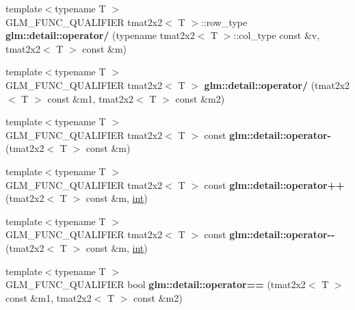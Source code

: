 \begin{DoxyCompactItemize}
\item 
\hypertarget{namespaceglm_1_1detail_af9e81bd9e91febb17004379caf5735a8}{}{\footnotesize template$<$typename T $>$ }\\G\+L\+M\+\_\+\+F\+U\+N\+C\+\_\+\+Q\+U\+A\+L\+I\+F\+I\+E\+R tmat2x2$<$ T $>$\+::row\+\_\+type {\bfseries glm\+::detail\+::operator/} (typename tmat2x2$<$ T $>$\+::col\+\_\+type const \&v, tmat2x2$<$ T $>$ const \&m)\label{namespaceglm_1_1detail_af9e81bd9e91febb17004379caf5735a8}

\item 
\hypertarget{namespaceglm_1_1detail_ab5912b54dc7146602edd91f006f4462b}{}{\footnotesize template$<$typename T $>$ }\\G\+L\+M\+\_\+\+F\+U\+N\+C\+\_\+\+Q\+U\+A\+L\+I\+F\+I\+E\+R tmat2x2$<$ T $>$ {\bfseries glm\+::detail\+::operator/} (tmat2x2$<$ T $>$ const \&m1, tmat2x2$<$ T $>$ const \&m2)\label{namespaceglm_1_1detail_ab5912b54dc7146602edd91f006f4462b}

\item 
\hypertarget{namespaceglm_1_1detail_a390878b96c35ed9f2001ef52fab96b76}{}{\footnotesize template$<$typename T $>$ }\\G\+L\+M\+\_\+\+F\+U\+N\+C\+\_\+\+Q\+U\+A\+L\+I\+F\+I\+E\+R tmat2x2$<$ T $>$ const {\bfseries glm\+::detail\+::operator-\/} (tmat2x2$<$ T $>$ const \&m)\label{namespaceglm_1_1detail_a390878b96c35ed9f2001ef52fab96b76}

\item 
\hypertarget{namespaceglm_1_1detail_a338c3904586ef319fbf88ab1c82a593f}{}{\footnotesize template$<$typename T $>$ }\\G\+L\+M\+\_\+\+F\+U\+N\+C\+\_\+\+Q\+U\+A\+L\+I\+F\+I\+E\+R tmat2x2$<$ T $>$ const {\bfseries glm\+::detail\+::operator++} (tmat2x2$<$ T $>$ const \&m, \hyperlink{_s_d_l__thread_8h_a6a64f9be4433e4de6e2f2f548cf3c08e}{int})\label{namespaceglm_1_1detail_a338c3904586ef319fbf88ab1c82a593f}

\item 
\hypertarget{namespaceglm_1_1detail_a76d3f6b9f19cce3637dd5d05d927dd84}{}{\footnotesize template$<$typename T $>$ }\\G\+L\+M\+\_\+\+F\+U\+N\+C\+\_\+\+Q\+U\+A\+L\+I\+F\+I\+E\+R tmat2x2$<$ T $>$ const {\bfseries glm\+::detail\+::operator-\/-\/} (tmat2x2$<$ T $>$ const \&m, \hyperlink{_s_d_l__thread_8h_a6a64f9be4433e4de6e2f2f548cf3c08e}{int})\label{namespaceglm_1_1detail_a76d3f6b9f19cce3637dd5d05d927dd84}

\item 
\hypertarget{namespaceglm_1_1detail_a7daa55112beb0033907dff7a695ff975}{}{\footnotesize template$<$typename T $>$ }\\G\+L\+M\+\_\+\+F\+U\+N\+C\+\_\+\+Q\+U\+A\+L\+I\+F\+I\+E\+R bool {\bfseries glm\+::detail\+::operator==} (tmat2x2$<$ T $>$ const \&m1, tmat2x2$<$ T $>$ const \&m2)\label{namespaceglm_1_1detail_a7daa55112beb0033907dff7a695ff975}


\end{DoxyCompactItemize}
